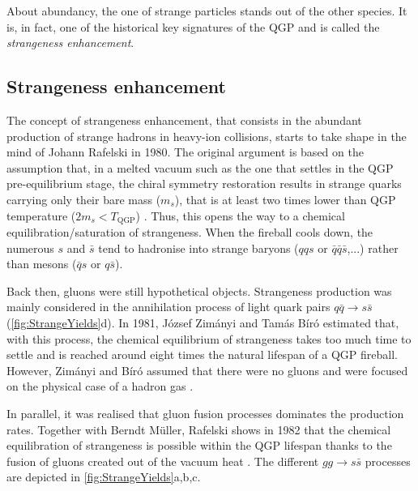 About abundancy, the one of strange particles stands out of the other species. It is, in fact, one of the historical key signatures of the QGP and is called the \textit{strangeness enhancement}. 

\subsection{Strangeness enhancement}

The concept of strangeness enhancement, that consists in the abundant production of strange hadrons in heavy-ion collisions, starts to take shape in the mind of Johann Rafelski in 1980. The original argument is based on the assumption that, in a melted vacuum such as the one that settles in the QGP pre-equilibrium stage, the chiral symmetry restoration results in strange quarks carrying only their bare mass ($m_{s}$), that is at least two times lower than QGP temperature ($2 m_{s} < T_{\textrm{QGP}}$) . Thus, this opens the way to a chemical equilibration/saturation of strangeness. When the fireball cools down, the numerous $s$ and $\bar{s}$ tend to hadronise into strange baryons ($qqs$ or $\bar{q}\bar{q}\bar{s}$,...) rather than mesons ($\bar{q}s$ or $q\bar{s}$).

Back then, gluons were still hypothetical objects. Strangeness production was mainly considered in the annihilation process of light quark pairs $q\bar{q} \rightarrow s \bar{s}$ (\fig\ref{fig:StrangeYields}d). In 1981, J\'ozsef Zim\'anyi and Tam\'as B\'ir\'o estimated that, with this process, the chemical equilibrium of strangeness takes too much time to settle and is reached around eight times the natural lifespan of a QGP fireball. However, Zim\'anyi and B\'ir\'o assumed that there were no gluons and were focused on the physical case of a hadron gas \cite{rafelskiStrangenessEnhancement2008}.

In parallel, it was realised that gluon fusion processes dominates the production rates. Together with Berndt M\"{u}ller, Rafelski shows in 1982 that the chemical equilibration of strangeness is possible within the QGP lifespan thanks to the fusion of gluons created out of the vacuum heat  \cite{rafelskiStrangenessProductionQuarkGluon1982}. The different $gg \rightarrow s\bar{s}$ processes are depicted in \fig\ref{fig:StrangeYields}a,b,c.


